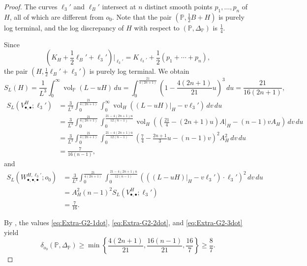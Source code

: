\documentclass[10pt,a4paper]{amsart}
\begin{document}
\begin{proof}
The curves $\ell_3'$ and $\ell_B'$ intersect at $n$ distinct smooth points
$
p_1,\ldots,p_n
$
of $H$, all of which are different from $o_0$. Note that the pair $(\mathbb{P},\frac{1}{2}B+H)$ is purely log terminal, and the log discrepancy of $H$ with respect to $(\mathbb{P},\Delta_\mathbb{P})$ is $\frac{1}{4}$.

Since
\[
\left(K_H+\frac{1}{2}\ell_B'+\ell_3'\right)\Big|_{\ell_3'}
=
K_{\ell_3'}+\frac{1}{2}\left(p_1+\cdots+p_n\right),
\]
the pair $(H,\frac{1}{2}\ell_B'+\ell_3')$ is purely log terminal. We obtain
\begin{equation}\label{eq:Extra-G2-1dot}
S_L(H)
=
\frac{1}{L^3}\int_0^\infty
\operatorname{vol}_{\mathbb P}(L-uH)\,du
=
\int_0^{\frac{21}{4(2n+1)}}
\left(1-\frac{4(2n+1)}{21}u\right)^3\,du
=
\frac{21}{16(2n+1)},
\end{equation}
\begin{equation}\label{eq:Extra-G2-2dot}
\begin{split}
S_L(V_{\bullet,\bullet}^{H};\ell_3')
&=
\frac{3}{L^3}
\int_0^{\frac{21}{4(2n+1)}}
\int_0^\infty
\operatorname{vol}_{H}
\left(\left.(L-uH)\right|_H-v\ell_3'\right)\,dv\,du\\
&=
\frac{3}{L^3}
\int_0^{\frac{21}{4(2n+1)}}
\int_0^{\frac{21-4(2n+1)u}{12(n-1)}}
\operatorname{vol}_{H}
\left(
\left(\frac{21}{4}-(2n+1)u\right)A|_H-(n-1)vA_H
\right)\,dv\,du\\
&=
\frac{3}{L^3}
\int_0^{\frac{21}{4(2n+1)}}
\int_0^{\frac{21-4(2n+1)u}{12(n-1)}}
\left(
\frac{7}{4}-\frac{2n+1}{3}u-(n-1)v
\right)^2 A_H^2\,dv\,du\\
&=
\frac{7}{16(n-1)},
\end{split}
\end{equation}
and 
\begin{equation}\label{eq:Extra-G2-3dot}
\begin{split}
S_L(W_{\bullet,\bullet,\bullet}^{H,\ell_3'};o_0)
&=
\frac{3}{L^3}
\int_0^{\frac{21}{4(2n+1)}}
\int_0^{\frac{21-4(2n+1)u}{12(n-1)}}
\left(
\left(
\left.(L-uH)\right|_H-v\ell_3'
\right)\cdot\ell_3'
\right)^2\,dv\,du\\
&=
A_H^2(n-1)^2
S_L(V_{\bullet,\bullet}^{H};\ell_3')\\
&=
\frac{7}{16}.
\end{split}
\end{equation}

By \cite[Corollary~4.8]{Fu23}, the values \eqref{eq:Extra-G2-1dot}, \eqref{eq:Extra-G2-2dot}, and \eqref{eq:Extra-G2-3dot} yield
\[
\delta_{o_0}(\mathbb{P},\Delta_\mathbb{P})
\geq
\min\left\{
\frac{4(2n+1)}{21},
\frac{16(n-1)}{21},
\frac{16}{7}
\right\}
\geq\frac{8}{7}.
\]



\end{proof}
\end{document}
